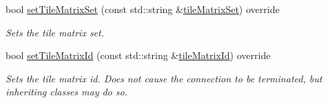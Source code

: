 \begin{DoxyCompactItemize}
bool \hyperlink{classdg_1_1deepcore_1_1imagery_1_1_wmts_client_a0053f545baed6b247f7e4bdf68af8d5c}{set\+Tile\+Matrix\+Set} (const std\+::string \&\hyperlink{group___imagery_module_gae380a970bc0aa63d34e6f2295ea9c8f4}{tile\+Matrix\+Set}) override
\begin{DoxyCompactList}\small\item\em Sets the tile matrix set. \end{DoxyCompactList}\item 
bool \hyperlink{classdg_1_1deepcore_1_1imagery_1_1_wmts_client_affa4f468e78952de79d3d8a49c5a14ab}{set\+Tile\+Matrix\+Id} (const std\+::string \&\hyperlink{group___imagery_module_gae6a1721e1da9ab60ab4e62240baf304b}{tile\+Matrix\+Id}) override
\begin{DoxyCompactList}\small\item\em Sets the tile matrix id. Does not cause the connection to be terminated, but inheriting classes may do so. \end{DoxyCompactList}\end{DoxyCompactItemize}
